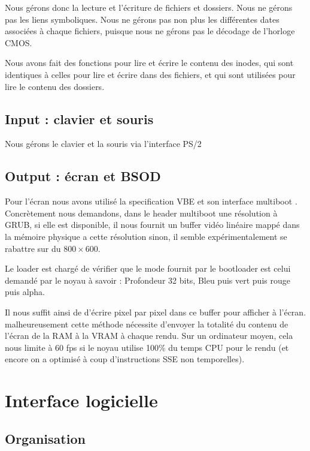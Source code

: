 \documentclass[12pt]{report}
\begin{document}
Nous gérons donc la lecture et l'écriture de fichiers et dossiers. Nous ne gérons pas les liens symboliques.
Nous ne gérons pas non plus les différentes dates associées à chaque fichiers, puisque nous ne gérons pas le décodage de l'horloge CMOS.

Nous avons fait des fonctions pour lire et écrire le contenu des inodes, qui sont identiques à celles pour lire et écrire dans des fichiers, et qui sont utilisées pour lire le contenu des dossiers.

\section{Input : clavier et souris}

Nous gérons le clavier et la souris via l'interface PS/2

\section{Output : écran et BSOD}

Pour l'écran nous avons utilisé la specification VBE \cite{specVBE} et son
interface multiboot \cite{multiboot}.
Concrètement nous demandons, dans le header multiboot une résolution à GRUB, si
elle est disponible, il nous fournit un buffer vidéo linéaire mappé dans la
mémoire physique a cette résolution sinon, il semble expérimentalement se
rabattre sur du $800 \times 600$.

Le loader est chargé de vérifier que le mode fournit par le bootloader est celui
demandé par le noyau à savoir : Profondeur 32 bits, Bleu puis vert puis rouge
puis alpha.

Il nous suffit ainsi de d'écrire pixel par pixel dans ce buffer pour afficher à
l'écran. malheureusement cette méthode nécessite d'envoyer la totalité du
contenu de l'écran de la RAM à la VRAM à chaque rendu. Sur un ordinateur moyen,
cela nous limite à 60 fps si le noyau utilise 100\% du temps CPU pour le rendu
(et encore on a optimisé à coup d'instructions SSE non temporelles).

\chapter{Interface logicielle}

\section{Organisation}
\end{document}
